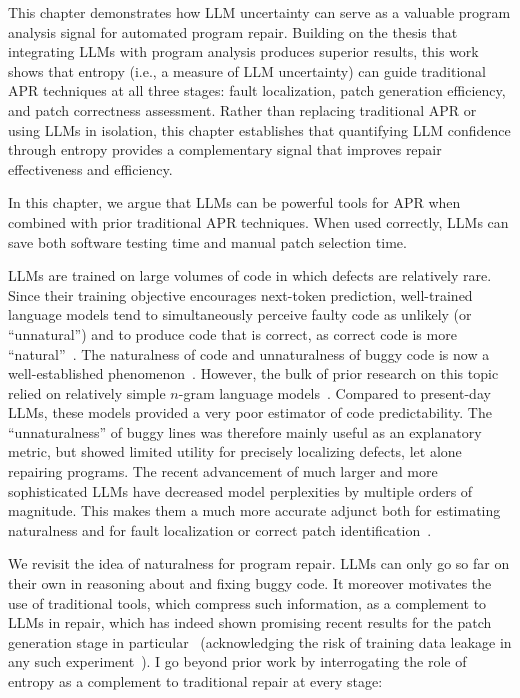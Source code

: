 \documentclass[12pt,openany,oneside,table]{cmuthesis}
\begin{document}
This chapter demonstrates how LLM uncertainty can serve as a valuable program analysis signal for automated program repair. Building on the thesis that integrating LLMs with program analysis produces superior results, this work shows that entropy (i.e., a measure of LLM uncertainty) can guide traditional APR techniques at all three stages: fault localization, patch generation efficiency, and patch correctness assessment. Rather than replacing traditional APR or using LLMs in isolation, this chapter establishes that quantifying LLM confidence through entropy provides a complementary signal that improves repair effectiveness and efficiency.

In this chapter, we argue that LLMs can be powerful tools for APR when combined with prior traditional APR techniques. When used correctly, LLMs can save both software testing time and manual patch selection time.

LLMs are trained on large volumes of code in which defects are relatively
rare. Since their training objective encourages next-token prediction,
well-trained language models tend to simultaneously perceive faulty code as unlikely
(or ``unnatural'') and to produce code that is correct, as correct code is more
``natural''~\cite{NAT}. The naturalness of code and unnaturalness of buggy 
code is now a well-established phenomenon~\cite{hindle2016naturalness,NAT}.
However, the bulk of prior research on this topic relied on relatively simple $n$-gram language
models~\cite{ngram}. Compared to present-day LLMs, these models provided a
very poor estimator of code predictability. The ``unnaturalness'' of
buggy lines was therefore mainly useful as an explanatory metric, but showed limited
utility for precisely localizing defects, let alone repairing programs.
The recent advancement of much larger and more sophisticated LLMs have decreased model
perplexities by multiple orders of magnitude. This makes them a much more accurate adjunct both for estimating naturalness and
for fault localization or correct patch identification~\cite{xia2023automated,
yang2023large}.

We revisit the idea of naturalness for program repair. 
LLMs can only go so far on their own in reasoning about and
fixing buggy code. It moreover motivates the use of traditional tools, which
compress such information, as a complement to LLMs in repair, which has indeed
shown promising recent results for the patch generation stage in
particular~\cite{xia2023automated} (acknowledging the risk of training data
leakage in any such experiment~\cite{balloccu2024leak}). 
I go beyond prior work by interrogating the role of entropy as a complement to
traditional repair at every stage:
\end{document}
